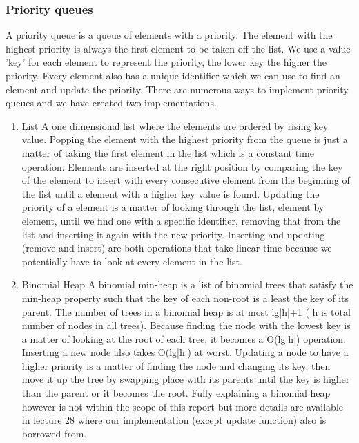 \documentclass[12pt, a4paper]{article}
\begin{document}

\subsubsection{Priority queues}
\label{Priority queues}

A priority queue is a queue of elements with a priority. The element with the highest priority is always the first element to be taken off the list. We use a value 'key'  for each element to represent the priority, the lower key the higher the priority. Every element also has a unique identifier which we can use to find an element and update the priority.  There are numerous ways to implement priority queues and we have created two implementations.

\begin{enumerate}
\item{List}
A one dimensional list where the elements are ordered by rising key value. Popping the element with the highest priority from the queue is just a matter of taking the first element in the list which is a constant time operation. Elements are inserted at the right position by comparing the key of the element to insert with every consecutive element from the beginning of the list until a element with a higher key value is found. Updating the priority of a element is a matter of looking through the list, element by element, until we find one with a specific identifier, removing that from the list and inserting it again with the new priority. Inserting and updating (remove and insert) are both operations that take linear time because we potentially have to look at every element in the list.

\item{Binomial Heap}
A binomial min-heap is a list of binomial trees that satisfy the min-heap property such that the key of each non-root is a least the key of its parent. The number of trees in a binomial heap is at most lg|h|+1 ( h is total number of nodes in all trees). Because finding the node with the lowest key is a matter of looking at the root of each tree, it becomes a O(lg|h|) operation. Inserting a new node also takes O(lg|h|) at worst. Updating a node to have a higher priority is a matter of finding the node and changing its key, then move it up the tree by swapping place with its parents until the key is higher than the parent or it becomes the root. Fully explaining a binomial heap however is not within the scope of this report but more details are available in lecture 28 \cite{lecture28} where our implementation (except update function) also is borrowed from.

\end{enumerate}
\end{document}
